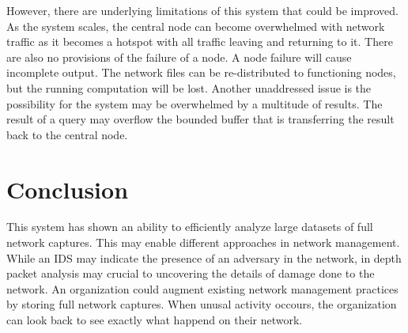 \documentclass{article}
\begin{document}
\begin{multicols}{2}
However, there are underlying limitations of this system that could be improved.  As the system scales, the central node can become overwhelmed with network traffic as it becomes a hotspot with all traffic leaving and returning to it. There are also no provisions of the failure of a node.  A node failure will cause incomplete output.  The network files can be re-distributed to functioning nodes, but the running computation will be lost.  Another unaddressed issue is the possibility for the system may be overwhelmed by a multitude of results. The result of a query may overflow the bounded buffer that is transferring the result back to the central node.  

\section*{Conclusion}

This system has shown an ability to efficiently analyze large datasets of full network captures. This may enable different approaches in network management.  While an IDS may indicate the presence of an adversary in the network, in depth packet analysis may crucial to uncovering the details of damage done to the network.  An organization could augment existing network management practices by storing full network captures.  When unusal activity occours, the organization can look back to see exactly what happend on their network.  

\end{multicols}
\end{document}
